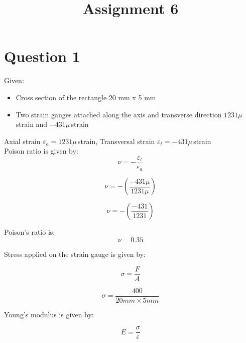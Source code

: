 \documentclass{article}
\begin{document}
\title{Assignment 6}
\date{}
\maketitle

\section*{Question 1}

Given:
\begin{itemize}
\item Cross section of the rectangle 20 mm x 5 mm
\item Two strain gauges attached along the axis and transverse 
direction $1231 \mu\, $strain and $-431\mu\, $strain
\end{itemize} 

Axial strain $ \varepsilon_a = 1231 \mu\, $strain,
Transversal strain $ \varepsilon_t = -431\mu\, $strain \\

Poison ratio is given by:
\begin{equation*}
    \nu    = -\frac{ \varepsilon_t}{\varepsilon_a}
\end{equation*}

\begin{equation*}
    \nu = -(\frac{-431 \mu }{1231 \mu })
\end{equation*}


\begin{equation*}
    \nu = -(\frac{-431}{1231})
\end{equation*}

Poison's ratio is:
\begin{equation*}
    \nu    = 0.35
\end{equation*}


Stress applied on the strain gauge is given by:

\begin{equation*}
    \sigma = \frac{F}{A}
\end{equation*}

\begin{equation*}
    \sigma = \frac{400}{20 mm \times 5 mm}
\end{equation*}

Young's modulus is given by:

\begin{equation*}
    E = \frac{\sigma}{\varepsilon}
\end{equation*}
\end{document}
